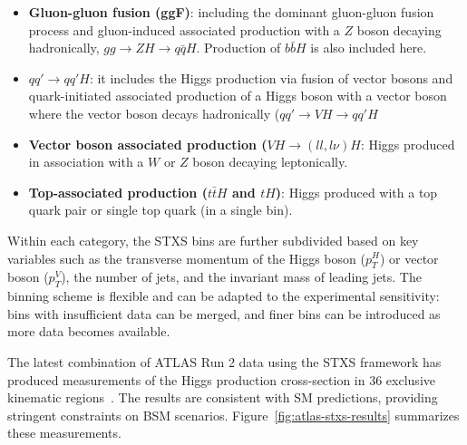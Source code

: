 \documentclass[11pt,twoside]{book}
\begin{document}
\begin{itemize}
    \item \textbf{Gluon-gluon fusion (ggF)}: including the dominant gluon-gluon fusion process and gluon-induced associated production with a $Z$ boson decaying hadronically, $gg \to ZH \to q\bar{q}H$. Production of $b\bar{b}H$ is also included here.
    \item \textbf{$qq'\to qq'H$}: it includes the Higgs production via fusion of vector bosons and quark-initiated associated production of a Higgs boson with a vector boson where the vector boson decays hadronically ($qq'\to VH \to qq'H$
    \item \textbf{Vector boson associated production ($VH \to (ll, l\nu)H$}: Higgs produced in association with a $W$ or $Z$ boson decaying leptonically.
    \item \textbf{Top-associated production ($t\bar{t}H$ and $tH$)}: Higgs produced with a top quark pair or single top quark (in a single bin).
\end{itemize}

Within each category, the STXS bins are further subdivided based on key variables such as the transverse momentum of the Higgs boson ($p^H_T$) or vector boson ($p^V_T$), the number of jets, and the invariant mass of leading jets. The binning scheme is flexible and can be adapted to the experimental sensitivity: bins with insufficient data can be merged, and finer bins can be introduced as more data becomes available.

The latest combination of ATLAS Run 2 data using the STXS framework has produced measurements of the Higgs production cross-section in 36 exclusive kinematic regions~\cite{arXiv:2207.00092}. The results are consistent with \acrshort{SM} predictions, providing stringent constraints on B\acrshort{SM} scenarios. Figure~\ref{fig:atlas-stxs-results} summarizes these measurements.
\end{document}
